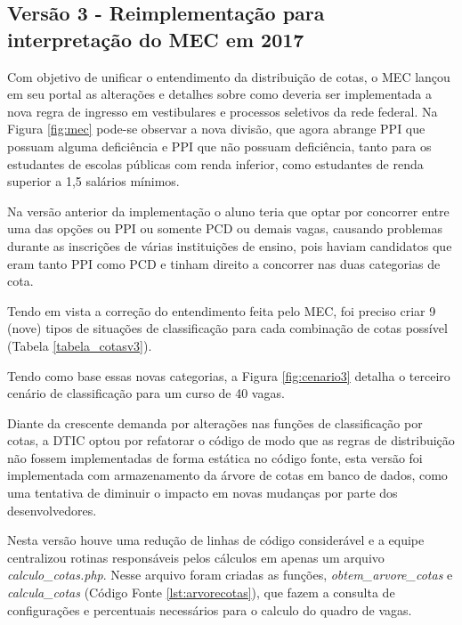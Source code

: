 \subsection{Versão 3 - Reimplementação para interpretação do MEC em 2017 }
\label{versao3}

Com objetivo de unificar o entendimento da distribuição de cotas, o \gls{MEC} lançou em seu portal as alterações e detalhes sobre como deveria ser implementada a nova regra de ingresso em vestibulares e processos seletivos da rede federal. Na Figura \ref{fig:mec} pode-se observar a nova divisão, que agora abrange \gls{PPI} que possuam alguma deficiência e \gls{PPI} que não possuam deficiência, tanto para os estudantes de escolas públicas com renda inferior, como estudantes de renda superior a 1,5 salários mínimos. 




Na versão anterior da implementação o aluno teria que optar por concorrer entre uma das opções ou \gls{PPI} ou somente \gls{PCD} ou demais vagas, causando problemas durante as inscrições de várias instituições de ensino, pois haviam candidatos que eram tanto \gls{PPI} como \gls{PCD} e tinham direito a concorrer nas duas categorias de cota.

Tendo em vista a correção do entendimento feita pelo \gls{MEC}, foi preciso criar 9 (nove) tipos de situações de classificação para cada combinação de cotas possível (Tabela \ref{tabela_cotasv3}).



Tendo como base essas novas categorias, a Figura \ref{fig:cenario3} detalha o terceiro cenário de classificação para um curso de 40 vagas. 



\newpage
Diante da crescente demanda por alterações nas funções de classificação por cotas, a \gls{DTIC} optou por refatorar o código de modo que as regras de distribuição não fossem implementadas de forma estática no código fonte, esta versão foi implementada com armazenamento da árvore de cotas em banco de dados, como uma tentativa de diminuir o impacto em novas mudanças por parte dos desenvolvedores. 

Nesta versão houve uma redução de linhas de código considerável e a equipe centralizou rotinas responsáveis pelos cálculos em apenas um arquivo \textit{calculo\_cotas.php}. Nesse arquivo foram criadas as funções, \textit{obtem\_arvore\_cotas} e \textit{calcula\_cotas} (Código Fonte \ref{lst:arvorecotas}), que fazem a consulta de configurações e percentuais necessários para o calculo do quadro de vagas. 

